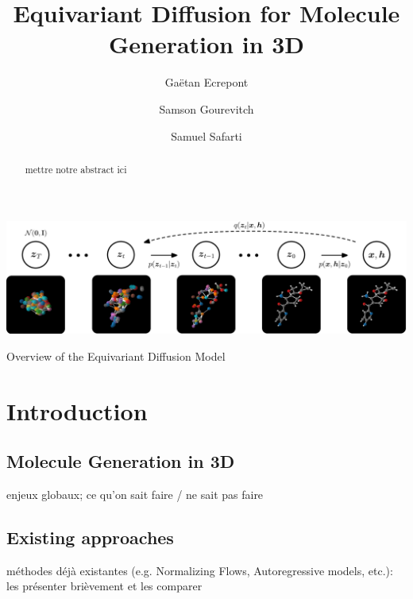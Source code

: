 \documentclass[sigconf]{acmart}
\begin{document}
\title{Equivariant Diffusion for Molecule Generation in 3D}

\author{Gaëtan Ecrepont}

\author{Samson Gourevitch}

\author{Samuel Safarti}

\begin{abstract}
  mettre notre abstract ici
\end{abstract}




\begin{teaserfigure}
  \includegraphics[width=\textwidth]{figures/overview_diffusion.pdf}
  \caption{Overview of the Equivariant Diffusion Model}
  \label{fig:teaser}
\end{teaserfigure}


\maketitle

\section{Introduction} %
\subsection{Molecule Generation in 3D}
enjeux globaux; ce qu'on sait faire / ne sait pas faire
\subsection{Existing approaches}
méthodes déjà existantes (e.g. Normalizing Flows, Autoregressive models, etc.): les présenter brièvement et les comparer
\end{document}
